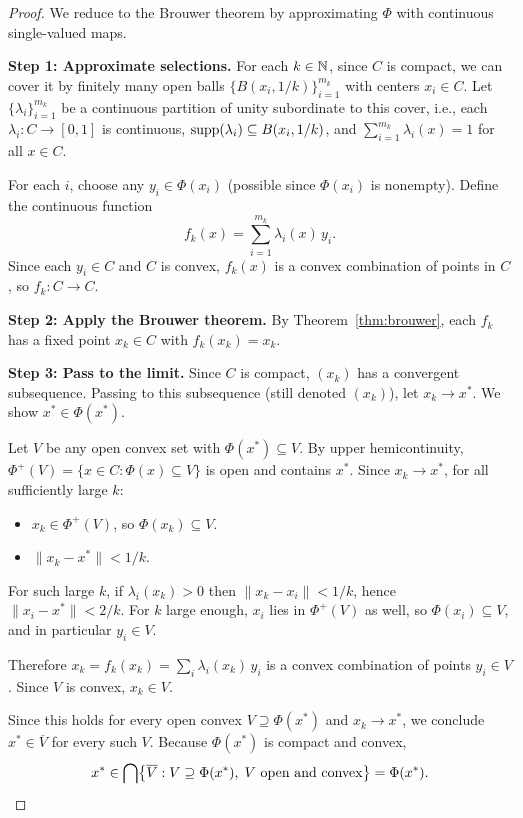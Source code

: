 \documentclass[11pt,a4paper]{article}
\begin{document}
\begin{proof}
We reduce to the Brouwer theorem by approximating $\Phi$ with
continuous single-valued maps.

\textbf{Step 1: Approximate selections.}
For each $k \in \mathbb{N}$, since $C$ is compact, we can cover it by finitely
many open balls $\{B(x_i, 1/k)\}_{i=1}^{m_k}$ with centers
$x_i \in C$.  Let $\{\lambda_i\}_{i=1}^{m_k}$ be a continuous
partition of unity subordinate to this cover, i.e., each
$\lambda_i \colon C \to [0,1]$ is continuous,
$\operatorname{supp}(\lambda_i) \subseteq B(x_i, 1/k)$, and
$\sum_{i=1}^{m_k} \lambda_i(x) = 1$ for all $x \in C$.

For each $i$, choose any $y_i \in \Phi(x_i)$ (possible since
$\Phi(x_i)$ is nonempty).  Define the continuous function
\[
    f_k(x) = \sum_{i=1}^{m_k} \lambda_i(x)\, y_i.
\]
Since each $y_i \in C$ and $C$ is convex, $f_k(x)$ is a convex
combination of points in $C$, so $f_k \colon C \to C$.

\textbf{Step 2: Apply the Brouwer theorem.}
By Theorem~\ref{thm:brouwer}, each $f_k$ has a fixed point
$x_k \in C$ with $f_k(x_k) = x_k$.

\textbf{Step 3: Pass to the limit.}
Since $C$ is compact, $(x_k)$ has a convergent subsequence.  Passing
to this subsequence (still denoted $(x_k)$), let $x_k \to x^*$.  We
show $x^* \in \Phi(x^*)$.

Let $V$ be any open convex set with $\Phi(x^*) \subseteq V$.  By
upper hemicontinuity, $\Phi^+(V) = \{x \in C : \Phi(x) \subseteq V\}$
is open and contains $x^*$.  Since $x_k \to x^*$, for all
sufficiently large $k$:
\begin{itemize}[nosep]
    \item $x_k \in \Phi^+(V)$, so $\Phi(x_k) \subseteq V$.
    \item $\|x_k - x^*\| < 1/k$.
\end{itemize}
For such large $k$, if $\lambda_i(x_k) > 0$ then
$\|x_k - x_i\| < 1/k$, hence $\|x_i - x^*\| < 2/k$.  For $k$
large enough, $x_i$ lies in $\Phi^+(V)$ as well, so
$\Phi(x_i) \subseteq V$, and in particular $y_i \in V$.

Therefore $x_k = f_k(x_k) = \sum_i \lambda_i(x_k)\, y_i$ is a convex
combination of points $y_i \in V$.  Since $V$ is convex, $x_k \in V$.

Since this holds for every open convex $V \supseteq \Phi(x^*)$ and
$x_k \to x^*$, we conclude $x^* \in \overline{V}$ for every such $V$.
Because $\Phi(x^*)$ is compact and convex,
\[
    x^* \in \bigcap
    \bigl\{\overline{V} : V \supseteq \Phi(x^*),\;
    V \text{ open and convex}\bigr\}
    = \Phi(x^*).
    \qedhere
\]
\end{proof}
\end{document}
